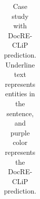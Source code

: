 \documentclass[letterpaper]{article} %
\begin{document}
\begin{table}[ht]
{\begin{tabular}{@{} p{1.2\linewidth}}


\hline
\end{tabular} 
}
\caption{Case study with DocRE-CLiP prediction. Underline text represents entities in the sentence, and purple color represents the DocRE-CLiP prediction.}
\label{casestudy}
\end{table}
\end{document}
